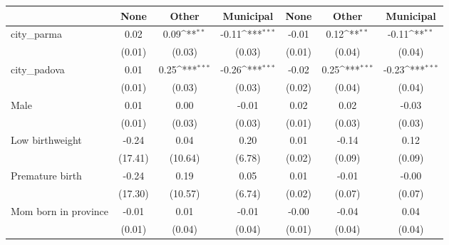{
\def\sym#1{\ifmmode^{#1}\else\(^{#1}\)\fi}
\begin{tabular}{l*{6}{c}}
\toprule
                    &\multicolumn{1}{c}{None}&\multicolumn{1}{c}{Other}&\multicolumn{1}{c}{Municipal}&\multicolumn{1}{c}{None}&\multicolumn{1}{c}{Other}&\multicolumn{1}{c}{Municipal}\\
\midrule
city\_parma          &        0.02         &        0.09\sym{**} &       -0.11\sym{***}&       -0.01         &        0.12\sym{**} &       -0.11\sym{**} \\
                    &      (0.01)         &      (0.03)         &      (0.03)         &      (0.01)         &      (0.04)         &      (0.04)         \\
\addlinespace
city\_padova         &        0.01         &        0.25\sym{***}&       -0.26\sym{***}&       -0.02         &        0.25\sym{***}&       -0.23\sym{***}\\
                    &      (0.01)         &      (0.03)         &      (0.03)         &      (0.02)         &      (0.04)         &      (0.04)         \\
\addlinespace
Male                &        0.01         &        0.00         &       -0.01         &        0.02         &        0.02         &       -0.03         \\
                    &      (0.01)         &      (0.03)         &      (0.03)         &      (0.01)         &      (0.03)         &      (0.03)         \\
\addlinespace
Low birthweight     &       -0.24         &        0.04         &        0.20         &        0.01         &       -0.14         &        0.12         \\
                    &     (17.41)         &     (10.64)         &      (6.78)         &      (0.02)         &      (0.09)         &      (0.09)         \\
\addlinespace
Premature birth     &       -0.24         &        0.19         &        0.05         &        0.01         &       -0.01         &       -0.00         \\
                    &     (17.30)         &     (10.57)         &      (6.74)         &      (0.02)         &      (0.07)         &      (0.07)         \\
\addlinespace
Mom born in province&       -0.01         &        0.01         &       -0.01         &       -0.00         &       -0.04         &        0.04         \\
                    &      (0.01)         &      (0.04)         &      (0.04)         &      (0.01)         &      (0.04)         &      (0.04)         \\

\end{tabular}}

